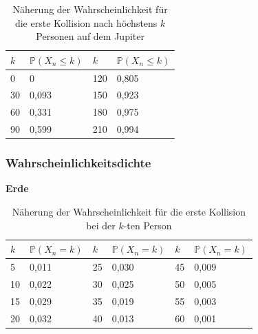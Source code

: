 \documentclass[../main.tex]{subfiles}
\begin{document}
    \begin{table}[h]
        \centering
        \begin{tabular}{|l|l|l|l|}
            \hline
            $k$ & $\mathbb{P}(X_{n} \leq k)$ & $k$ & $\mathbb{P}(X_{n} \leq k)$ \\ \hline
            0   & 0                          & 120 & 0,805                      \\
            30  & 0,093                      & 150 & 0,923                      \\
            60  & 0,331                      & 180 & 0,975                      \\
            90  & 0,599                      & 210 & 0,994                      \\ \hline
        \end{tabular}
        \caption{\label{num.tpj} Näherung der Wahrscheinlichkeit für die erste Kollision nach höchstens $k$ Personen auf dem Jupiter}
    \end{table}

    \subsubsection{Wahrscheinlichkeitsdichte}

    \textbf{Erde}

    \begin{table}[h]
        \centering
        \begin{tabular}{|l|l|l|l|l|l|}
            \hline
            $k$ & $\mathbb{P}(X_{n} = k)$ & $k$ & $\mathbb{P}(X_{n} = k)$ & $k$ & $\mathbb{P}(X_{n} = k)$ \\ \hline
            5   & 0,011                   & 25  & 0,030                   & 45  & 0,009                   \\
            10  & 0,022                   & 30  & 0,025                   & 50  & 0,005                   \\
            15  & 0,029                   & 35  & 0,019                   & 55  & 0,003                   \\
            20  & 0,032                   & 40  & 0,013                   & 60  & 0,001                   \\ \hline
        \end{tabular}
        \caption{\label{num.tpeqe} Näherung der Wahrscheinlichkeit für die erste Kollision bei der $k$-ten Person}
    \end{table}
\end{document}
